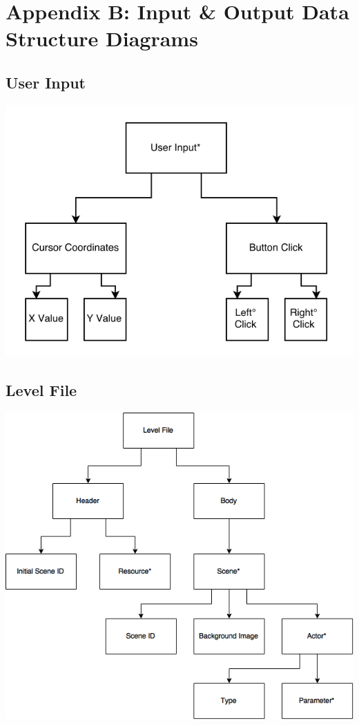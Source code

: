 \documentclass{article}
\begin{document}
\section{Appendix B: Input \& Output Data Structure Diagrams}
	\subsection{User Input}
		\begin{center}
			\includegraphics{UserInput}
		\end{center}
	\subsection{Level File}
		\begin{center}
			\includegraphics[scale=0.75]{LevelFile}
		\end{center}
\end{document}
